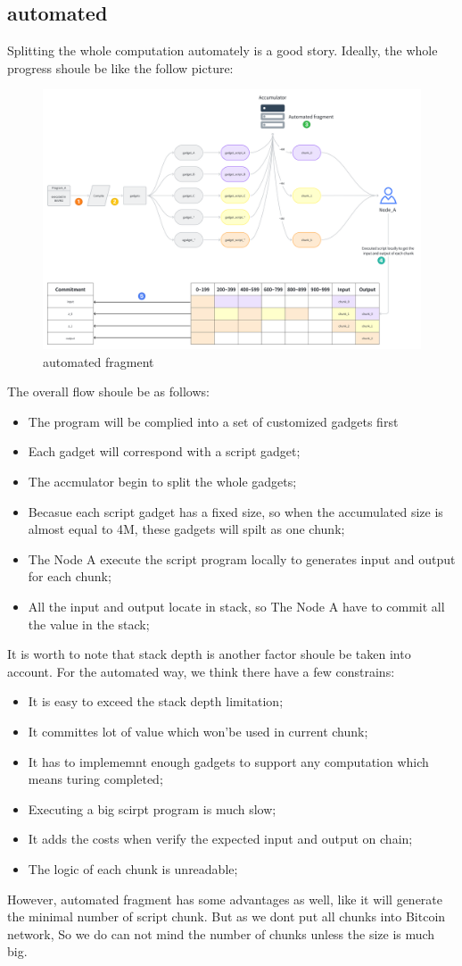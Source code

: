 \subsection{automated}

Splitting the whole computation automately is a good story. Ideally, the whole progress shoule be like the follow picture:

\begin{figure}[ht] 
    \centering  
    \includegraphics[width=0.85\columnwidth]{images/automated-fragment.png} 
    \caption{automated fragment}
    \label{fig:automated-fragment}
\end{figure}

The overall flow shoule be as follows:
\begin{itemize}
    \item The program will be complied into a set of customized gadgets first
    \item Each gadget will correspond with a script gadget;
    \item The accmulator begin to split the whole gadgets;
    \item Becasue each script gadget has a fixed size, so when the accumulated size is almost equal to 4M, these gadgets will spilt as one chunk;
    \item The Node A execute the script program locally to generates input and output for each chunk;
    \item All the input and output locate in stack, so The Node A have to commit all the value in the stack;
\end{itemize}

It is worth to note that stack depth is another factor shoule be taken into account. For the automated way, we think there have a few constrains:
\begin{itemize}
    \item It is easy to exceed the stack depth limitation;
    \item It committes lot of value which won'be used in current chunk;
    \item It has to implememnt enough gadgets to support any computation which means turing completed;
    \item Executing a big scirpt program is much slow;
    \item It adds the costs when verify the expected input and output on chain;
    \item The logic of each chunk is unreadable;
\end{itemize}

However, automated fragment has some advantages as well, like it will generate the minimal number of script chunk. But as we dont put 
all chunks into Bitcoin network, So we do can not mind the number of chunks unless the size is much big.